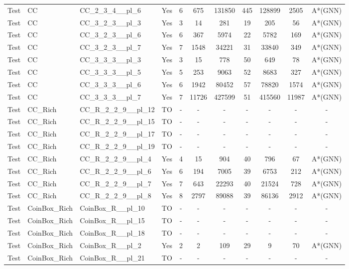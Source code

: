 \documentclass{article}
\begin{document}
\begin{tabular}{lllcccccccc}
Test & CC & CC\_2\_3\_4\_\_pl\_6 & Yes & 6 & 675 & 131850 & 445 & 128899 & 2505 & A*(GNN) \\
Test & CC & CC\_3\_2\_3\_\_pl\_3 & Yes & 3 & 14 & 281 & 19 & 205 & 56 & A*(GNN) \\
Test & CC & CC\_3\_2\_3\_\_pl\_6 & Yes & 6 & 367 & 5974 & 22 & 5782 & 169 & A*(GNN) \\
Test & CC & CC\_3\_2\_3\_\_pl\_7 & Yes & 7 & 1548 & 34221 & 31 & 33840 & 349 & A*(GNN) \\
Test & CC & CC\_3\_3\_3\_\_pl\_3 & Yes & 3 & 15 & 778 & 50 & 649 & 78 & A*(GNN) \\
Test & CC & CC\_3\_3\_3\_\_pl\_5 & Yes & 5 & 253 & 9063 & 52 & 8683 & 327 & A*(GNN) \\
Test & CC & CC\_3\_3\_3\_\_pl\_6 & Yes & 6 & 1942 & 80452 & 57 & 78820 & 1574 & A*(GNN) \\
Test & CC & CC\_3\_3\_3\_\_pl\_7 & Yes & 7 & 11726 & 427599 & 51 & 415560 & 11987 & A*(GNN) \\
Test & CC\_Rich & CC\_R\_2\_2\_9\_\_pl\_12 & TO & - & - & - & - & - & - & - \\
Test & CC\_Rich & CC\_R\_2\_2\_9\_\_pl\_15 & TO & - & - & - & - & - & - & - \\
Test & CC\_Rich & CC\_R\_2\_2\_9\_\_pl\_17 & TO & - & - & - & - & - & - & - \\
Test & CC\_Rich & CC\_R\_2\_2\_9\_\_pl\_19 & TO & - & - & - & - & - & - & - \\
Test & CC\_Rich & CC\_R\_2\_2\_9\_\_pl\_4 & Yes & 4 & 15 & 904 & 40 & 796 & 67 & A*(GNN) \\
Test & CC\_Rich & CC\_R\_2\_2\_9\_\_pl\_6 & Yes & 6 & 194 & 7005 & 39 & 6753 & 212 & A*(GNN) \\
Test & CC\_Rich & CC\_R\_2\_2\_9\_\_pl\_7 & Yes & 7 & 643 & 22293 & 40 & 21524 & 728 & A*(GNN) \\
Test & CC\_Rich & CC\_R\_2\_2\_9\_\_pl\_8 & Yes & 8 & 2797 & 89088 & 39 & 86136 & 2912 & A*(GNN) \\
Test & CoinBox\_Rich & CoinBox\_R\_\_pl\_10 & TO & - & - & - & - & - & - & - \\
Test & CoinBox\_Rich & CoinBox\_R\_\_pl\_15 & TO & - & - & - & - & - & - & - \\
Test & CoinBox\_Rich & CoinBox\_R\_\_pl\_18 & TO & - & - & - & - & - & - & - \\
Test & CoinBox\_Rich & CoinBox\_R\_\_pl\_2 & Yes & 2 & 2 & 109 & 29 & 9 & 70 & A*(GNN) \\
Test & CoinBox\_Rich & CoinBox\_R\_\_pl\_21 & TO & - & - & - & - & - & - & - \\

\end{tabular}
\end{document}
